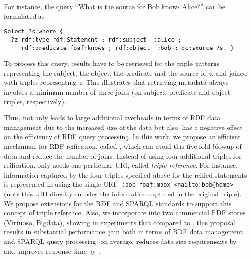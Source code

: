\begin{example}
For instance, the query ``What is the source for Bob knows Alice?'' can be formulated as 

\begin{footnotesize}%
	\begin{verbatim}
Select ?s where {
  ?z rdf:type rdf:Statement ; rdf:subject _:alice ;
     rdf:predicate foaf:knows ; rdf:object _:bob ; dc:source ?s. }

\end{verbatim}%
\end{footnotesize}
To process this query, results have to be retrieved for the triple patterns representing the subject, the object, the predicate and the source of $z$, and joined with triples representing $z$. This illustrates that retrieving metadata always involves a minimum number of three joins (on subject, predicate and object triples, respectively). 
\end{example}

Thus, {\Reifi} not only leads to large additional overheads in terms of RDF data management due to the increased size of the data but also, has a negative effect on the efficiency of RDF query processing. In this work, we propose an efficient mechanism for RDF reification, called \emph{\ReifiPlus}, which can avoid this five fold blowup of data and reduce the number of joins. Instead of using four additional triples for reification, {\ReifiPlus} only needs one particular URI, called \emph{triple reference}. For instance, information captured by the four triples specified above for the reified statements is represented in {\ReifiPlus} using the single URI \verb+_:bob foaf:mbox <mailto:bob@home>+ (note this URI directly encodes the information captured in the original triple). We propose extensions for the RDF and SPARQL standards to support this concept of triple reference. Also, we incorporate {\ReifiPlus} into two commercial RDF stores (Virtuoso, Bigdata), showing in experiments that compared to {\Reifi}, this proposal results in substantial performance gain both in terms of RDF data management and SPARQL query processing: on average, {\ReifiPlus} reduces data size requirements by  and improves response time by .

%

